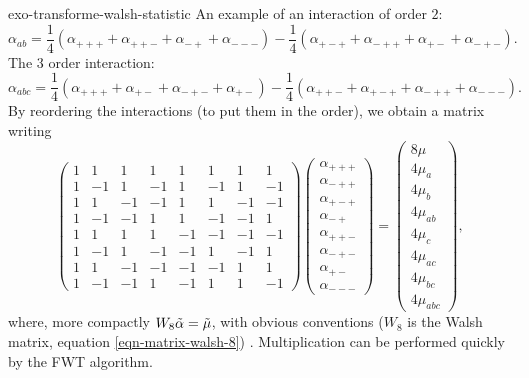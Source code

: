  
\begin{correction}{exo-transforme-walsh-statistic}
An example of an interaction of order $ 2 $:
\begin{equation*}
\alpha_{ab} = \frac{1}{4} (\alpha_{+++} + \alpha_{++ -} + \alpha_{- +} + \alpha_{---}) - \frac{1}{4} (\alpha_{+ - +} + \alpha_{- ++} + \alpha_{+ -} + \alpha_{- + -}).
\end{equation*}
The $ 3 $ order interaction:
\begin{equation*}
\alpha_{abc} = \frac{1}{4} (\alpha_{+++} + \alpha_{+ -} + \alpha_{- + -} + \alpha_{+ -}) - \frac{1}{4} (\alpha_{++ -} + \alpha_{+ - +} + \alpha_{- ++} + \alpha_{---}).
\end{equation*}
By reordering the interactions (to put them in the  order), we obtain a matrix writing
\begin{equation*}
\begin{pmatrix} 1 & 1 & 1 & 1 & 1 & 1 & 1 & 1 \\1 & -1 & 1 & -1 & 1 & -1 & 1 & -1 \\1 & 1 & -1 & -1 & 1 & 1 & -1 & -1 \\1 & -1 & -1 & 1 & 1 & -1 & -1 & 1 \\1 & 1 & 1 & 1 & -1 & -1 &-1 & -1 \\1 & -1 & 1 & -1 & -1 & 1 & -1 & 1 \\1 & 1 & -1 & -1 & -1 & -1 & 1 & 1 \\1 & -1 & -1 & 1 & -1 & 1 & 1 & -1 \end{pmatrix} \begin{pmatrix} \alpha_{+++} \\\alpha_{- ++} \\\alpha_{+ - +} \\\alpha_{- +} \\\alpha_{++ -} \\\alpha_{- + -} \\\alpha_{+ -} \\\alpha_{---} \end{pmatrix} = \begin{pmatrix} 8 \mu \\4 \mu_{a} \\4 \mu_{b} \\4 \mu_{ab} \\4 \mu_{c} \\4 \mu_{ac} \\4 \mu_{bc} \\4 \mu_{abc} \end{pmatrix},
\end{equation*}
where, more compactly $ W_8 \tilde{\alpha} = \tilde{\mu} $, with obvious conventions ($ W_8 $ is the Walsh matrix, equation \eqref{eqn-matrix-walsh-8}) . Multiplication can be performed quickly by the FWT algorithm.
\end{correction}
 
